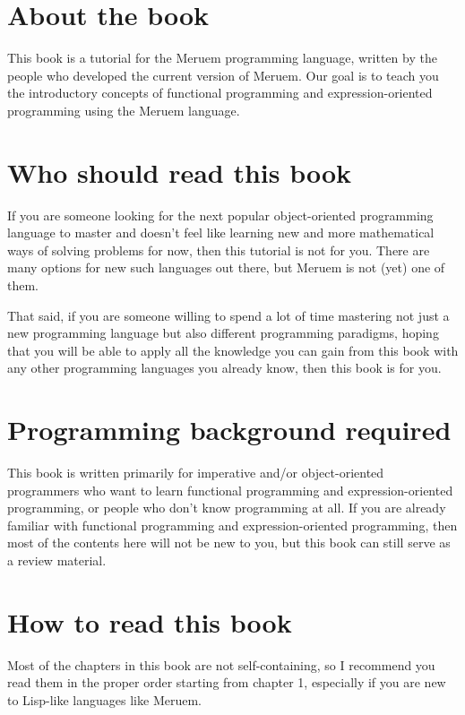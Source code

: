 \section{About the book}
This book is a tutorial for the Meruem programming language, written by the people who developed the current version of Meruem. Our goal is to teach you the introductory concepts of functional programming and expression-oriented programming using the Meruem language. 

\section{Who should read this book}
If you are someone looking for the next popular object-oriented programming language to master and doesn't feel like learning new and more mathematical ways of solving problems for now, then this tutorial is not for you. There are many options for new such languages out there, but Meruem is not (yet) one of them.

That said, if you are someone willing to spend a lot of time mastering not just a new programming language but also different programming paradigms, hoping that you will be able to apply all the knowledge you can gain from this book with any other programming languages you already know, then this book is for you.

\section{Programming background required}
This book is written primarily for imperative and/or object-oriented programmers who want to learn functional programming and expression-oriented programming, or people who don't know programming at all. If you are already familiar with functional programming and expression-oriented programming, then most of the contents here will not be new to you, but this book can still serve as a review material.

\section{How to read this book}
Most of the chapters in this book are not self-containing, so I recommend you read them in the proper order starting from chapter 1, especially if you are new to Lisp-like languages like Meruem. 
